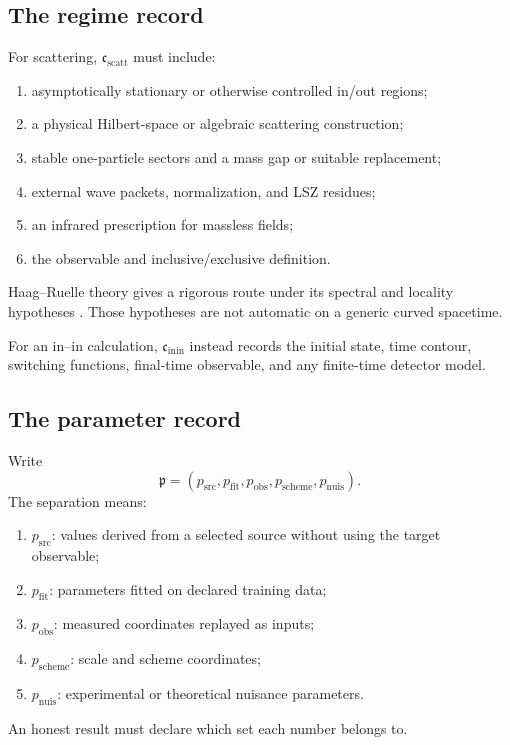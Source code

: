 \documentclass[11pt,a4paper]{article}
\numberwithin{equation}{section}
\theoremstyle{definition}
\theoremstyle{remark}
\begin{document}
\subsection{The regime record}

For scattering, \(\mathfrak c_{\mathrm{scatt}}\) must include:
\begin{enumerate}
\item asymptotically stationary or otherwise controlled in/out regions;
\item a physical Hilbert-space or algebraic scattering construction;
\item stable one-particle sectors and a mass gap or suitable replacement;
\item external wave packets, normalization, and LSZ residues;
\item an infrared prescription for massless fields;
\item the observable and inclusive/exclusive definition.
\end{enumerate}
Haag--Ruelle theory gives a rigorous route under its spectral and locality
hypotheses \cite{Haag1958,Ruelle1962}.  Those hypotheses are not automatic
on a generic curved spacetime.

For an in--in calculation, \(\mathfrak c_{\mathrm{inin}}\) instead records
the initial state, time contour, switching functions, final-time
observable, and any finite-time detector model.

\subsection{The parameter record}

Write
\[
\mathfrak p=(p_{\mathrm{src}},p_{\mathrm{fit}},
p_{\mathrm{obs}},p_{\mathrm{scheme}},p_{\mathrm{nuis}}).
\]
The separation means:
\begin{enumerate}
\item \(p_{\mathrm{src}}\): values derived from a selected source without
using the target observable;
\item \(p_{\mathrm{fit}}\): parameters fitted on declared training data;
\item \(p_{\mathrm{obs}}\): measured coordinates replayed as inputs;
\item \(p_{\mathrm{scheme}}\): scale and scheme coordinates;
\item \(p_{\mathrm{nuis}}\): experimental or theoretical nuisance
parameters.
\end{enumerate}
An honest result must declare which set each number belongs to.
\end{document}
